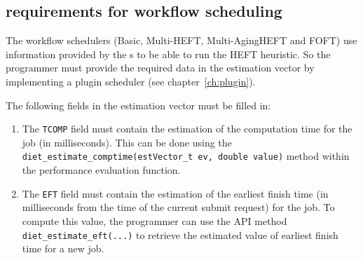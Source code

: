 \subsection{\sed requirements for workflow scheduling}

The workflow schedulers (Basic, Multi-HEFT, Multi-AgingHEFT and FOFT) use
information provided by the {\sed}s to be able to run the HEFT heuristic. So
the \sed programmer must provide the required data in the estimation vector by
implementing a plugin scheduler (see chapter~\ref{ch:plugin}).

The following fields in the estimation vector must be filled in:
\begin{enumerate}
\item The \texttt{TCOMP} field must contain the estimation of the computation
  time for the job (in milliseconds). This can be done using the
  \texttt{diet\_estimate\_comptime(estVector\_t ev, double value)} method
  within the performance evaluation function.
\item The \texttt{EFT} field must contain the estimation of the earliest finish
  time (in milliseconds from the time of the current submit request) for the
  job. To compute this value, the \sed programmer can use the API method
  \\ \texttt{diet\_estimate\_eft(...)} to retrieve the estimated value of
  earliest finish time for a new job.
\end{enumerate}

